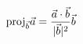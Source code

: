 \documentclass[preview]{standalone}
\begin{document}
\begin{align*}
\special{dvisvgm:raw <g id='unique000'>}\text{proj}_{\vec{b}} \vec{a} = \frac{\vec{a} \cdot \vec{b}}{|\vec{b}|^2} \vec{b}\special{dvisvgm:raw </g>}
\end{align*}
\end{document}

